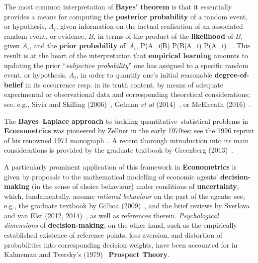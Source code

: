 \medskip
\noindent
The most common interpretation of \textbf{Bayes' theorem} is 
that it essentially provides a means for computing the
\textbf{posterior probability} of a random event, or hypothesis,
$A_{i}$, given information on the factual realisation of an
associated random event, or evidence, $B$, in terms of the product
of the \textbf{likelihood} of $B$, given $A_{i}$, and the
\textbf{prior probability} of~$A_{i}$,
%
\be
{}
P(A_{i}|B) \propto P(B|A_{i}) \times P(A_{i}) \ .
\ee
%
This result
is at the heart of the interpretation that \textbf{empirical 
learning} amounts to updating the prior ``\textit{subjective 
probability}'' one has assigned to a specific random 
event, or hypothesis, $A_{i}$, in order to quantify one's initial
reasonable \textbf{degree-of-belief} in its occurrence resp. in its
truth content, by means of adequate experimental or observational
data and corresponding theoretical considerations; see, e.g., Sivia
and Skilling (2006)~, Gelman \textit{et al}
(2014)~, or McElreath
(2016)~.

\medskip
\noindent
The \textbf{Bayes--Laplace approach} to tackling 
quantitative--statistical problems in \textbf{Econometrics} was 
pioneered by Zellner in the early 1970ies; see the 1996 reprint of 
his renowned 1971 monograph~. A recent thorough 
introduction into its main considerations is provided by the 
graduate textbook by Greenberg (2013)~.

\medskip
\noindent
A particularly prominent application of this framework in
\textbf{Econometrics} is given by proposals to the mathematical
modelling of economic agents' \textbf{decision-making} (in the
sense of choice behaviour) under conditions of
\textbf{uncertainty}, which, fundamentally, assume \textit{rational
behaviour} on the part of the agents; see, e.g., the graduate
textbook by Gilboa (2009)~, and the brief reviews by
Svetlova and van Elst (2012, 2014)~, as
well as references therein. \textit{Psychological dimensions} of 
\textbf{decision-making}, on the other hand, such as the
empirically established existence of reference points, loss
aversion, and distortion of probabilities into corresponding
decision weights, have been accounted for in Kahneman and Tversky's 
(1979)~ \textbf{Prospect Theory}.

